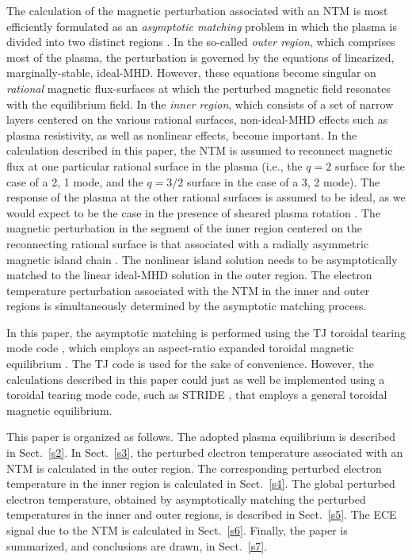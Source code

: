 \documentclass{iopjournal}
\begin{document}
The calculation of the  magnetic perturbation associated with an NTM is most efficiently formulated as an {\em asymptotic matching}\/ problem in which the  plasma is  divided into two distinct regions \cite{tear1,tear2,tear3,tear5,tear4,tear6,tear7,tear8,tear9,tear10}.    In the so-called {\em outer region}, which comprises most
of the plasma, the perturbation is governed by the equations of linearized, marginally-stable, ideal-MHD.
However, these equations become singular on   {\em rational}\/ magnetic flux-surfaces at which the perturbed magnetic field resonates with the equilibrium field. In the {\em inner region}, which
consists of a set of narrow layers centered on the various rational surfaces, non-ideal-MHD effects such as plasma resistivity, as well as nonlinear effects,  become important. 
 In the calculation described in this paper, the NTM is assumed to reconnect magnetic flux at one particular rational surface in the plasma (i.e., the
 $q=2$ surface for the case of a 2, 1 mode, and the $q=3/2$ surface in the case of a 3, 2 mode). The response of the plasma at the
 other rational surfaces is assumed to be ideal, as we would expect to be the case in the presence of sheared plasma rotation \cite{tear5}.
The magnetic perturbation in the segment of the inner region centered on the reconnecting rational surface is that associated with a radially asymmetric magnetic island chain \cite{ntm1,island}.
The nonlinear island solution needs to be asymptotically matched to the linear ideal-MHD solution in the outer region. The
electron temperature perturbation associated with the NTM in the inner and outer regions is simultaneously  determined by the asymptotic matching process. 

In this paper, the asymptotic matching is performed using the TJ toroidal tearing mode code \cite{tear9,tear10},  which employs an aspect-ratio
expanded toroidal magnetic equilibrium \cite{exp}. The TJ code is used for the sake of convenience. However, the calculations described in this paper
could just as well be implemented using a toroidal tearing mode code, such as STRIDE \cite{tear7,tear8}, that employs a general toroidal magnetic 
equilibrium. 

This paper is organized as follows. The adopted plasma equilibrium is described in Sect.~\ref{s2}.  In Sect.~\ref{s3}, the perturbed electron temperature associated with  an NTM is calculated in the outer region. The corresponding perturbed electron temperature  in the inner region is calculated in Sect.~\ref{s4}. The
global perturbed electron temperature, obtained by asymptotically matching the perturbed temperatures  in  the inner and outer regions, is
described in Sect.~\ref{s5}. 
The ECE signal due to the NTM is calculated in Sect.~\ref{s6}.
 Finally, the paper is summarized, and conclusions are drawn, in Sect.~\ref{s7}. 
\end{document}

